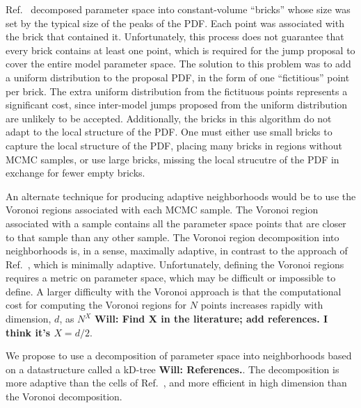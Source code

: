 \documentclass[prd,preprint]{revtex4}
\newcommand{\will}[1]{{\color{blue} \bf Will: #1}}
\begin{document}
Ref.~\cite{Littenberg2009} decomposed parameter space into
constant-volume ``bricks'' whose size was set by the typical size of
the peaks of the PDF.  Each point was associated with the brick that
contained it.  Unfortunately, this process does not guarantee that
every brick contains at least one point, which is required for the
jump proposal to cover the entire model parameter space.  The solution
to this problem was to add a uniform distribution to the proposal PDF,
in the form of one ``fictitious'' point per brick.  The extra uniform
distribution from the fictituous points represents a significant cost,
since inter-model jumps proposed from the uniform distribution are
unlikely to be accepted.  Additionally, the bricks in this algorithm
do not adapt to the local structure of the PDF.  One must either use
small bricks to capture the local structure of the PDF, placing many
bricks in regions without MCMC samples, or use large bricks, missing
the local strucutre of the PDF in exchange for fewer empty bricks.

An alternate technique for producing adaptive neighborhoods would be
to use the Voronoi regions associated with each MCMC sample.  The
Voronoi region associated with a sample contains all the parameter
space points that are closer to that sample than any other sample.
The Voronoi region decomposition into neighborhoods is, in a sense,
maximally adaptive, in contrast to the approach of
Ref.~\cite{Littenberg2009}, which is minimally adaptive.
Unfortunately, defining the Voronoi regions requires a metric on
parameter space, which may be difficult or impossible to define.  A
larger difficulty with the Voronoi approach is that the computational
cost for computing the Voronoi regions for $N$ points increases
rapidly with dimension, $d$, as $N^X$ \will{Find X in the literature;
  add references.  I think it's $X = d/2$}.

We propose to use a decomposition of parameter space into
neighborhoods based on a datastructure called a kD-tree
\will{References.}.  The decomposition is more adaptive than the cells
of Ref.~\cite{Littenberg2009}, and more efficient in high dimension
than the Voronoi decomposition.  
\end{document}
